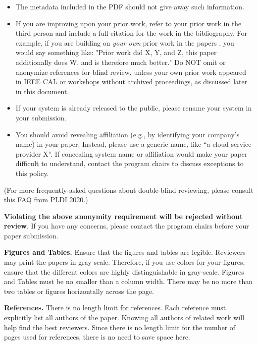 \documentclass[pageno]{jpaper}
\begin{document}
\begin{itemize}
\item The metadata included in the PDF should not give away such
information. 

\item If you are improving upon your prior work, refer to your prior
work in the third person and include a full citation for the work in the
bibliography.  For example, if you are building on {\em your own} prior
work in the papers \cite{nicepaper1,nicepaper2,nicepaper3}, you would say
something like: "Prior work
\cite{nicepaper1,nicepaper2,nicepaper3} did X, Y, and Z, this paper
additionally does W, and is therefore much better."  Do NOT omit or
anonymize references for blind review, unless
your own prior work appeared in IEEE CAL or workshops without archived
proceedings, as discussed later in this document.

\item If your system is already released to the public, please rename your system in your submission.

\item You should avoid revealing affiliation (e.g., by identifying your company’s name) in your paper. Instead, please use a generic name, like “a cloud service provider X”.  
If concealing system name or affiliation would make your paper difficult to understand, contact the program chairs to discuss exceptions to this policy.
\end{itemize}

(For more frequently-asked questions about double-blind reviewing, please 
consult this 
\href{https://pldi20.sigplan.org/track/pldi-2020-papers#FAQ-on-Double-Blind-Reviewing}
{FAQ from PLDI 2020}.)

\textbf{Violating the above anonymity requirement will be rejected without review}. If you have any concerns, please contact the program chairs before your paper submission.

\noindent\textbf{Figures and Tables.} Ensure that the figures and tables
are legible. 
Reviewers may print the papers in gray-scale. Therefore, if you use
colors for your figures, ensure that the different colors are highly
distinguishable in gray-scale. Figures and Tables must be no smaller than a column width.  There may be no more than two tables or figures horizontally across the page.

\noindent\textbf{References.}  There is no length limit for references.
Each reference must explicitly list all authors of the paper.
Knowing all authors of related
work will help find the best reviewers. Since there is no length limit
for the number of pages used for references, there is no need to save space
here.
\end{document}
